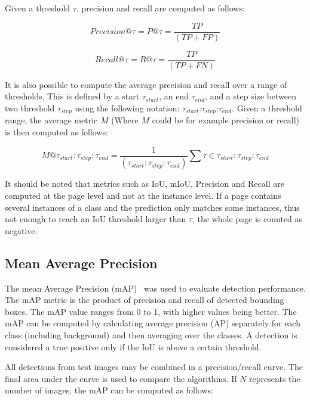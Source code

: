 \documentclass[oneside, english, bibtex]{kththesis}
\begin{document}
Given a threshold $\tau$, precision and recall are computed as follows:

\begin{equation}
    Precision @ \tau = P@\tau = \frac{TP}{(TP + FP)}
    \label{eqn:precision}
\end{equation}

\begin{equation}
    Recall @ \tau = R@\tau = \frac{TP}{(TP + FN)}
    \label{eqn:recall}
\end{equation}

It is also possible to compute the average precision and recall over a range of thresholds. This is defined by a start $\tau_{start}$, an end $\tau_{end}$, and a step size between two threshold $\tau_{step}$ using the following notation: $\tau_{start}$:$\tau_{step}$:$\tau_{end}$. Given a threshold range, the average metric $M$ (Where $M$ could be for example precision or recall) is then computed as follows:

\begin{equation}
M@\tau_{start}:\tau_{step}:\tau_{end} = \frac{1}{(\tau_{start}:\tau_{step}:\tau_{end})} \sum{} \tau \in \tau_{start}:\tau_{step}:\tau_{end}
    \label{eqn:rangem}
\end{equation}

It should be noted that metrics such as IoU, mIoU, Precision and Recall are computed at the page level and not at the instance level. If a page contains several instances of a class and the prediction only matches some instances, thus not enough to reach an IoU threshold larger than $\tau$, the whole page is counted as negative.

\subsection{Mean Average Precision}

The mean Average Precision (mAP)~\cite{zhang2009average} was used to evaluate detection performance. The mAP metric is the product of precision and recall of detected bounding boxes. The mAP value ranges from 0 to 1, with higher values being better. The mAP can be computed by calculating average precision (AP) separately for each class (including background) and then averaging over the classes. A detection is considered a true positive only if the IoU is above a certain threshold.

All detections from test images may be combined in a precision/recall curve. The final area under the curve is used to compare the algorithms. If $N$ represents the number of images, the mAP can be computed as follows:
\end{document}
